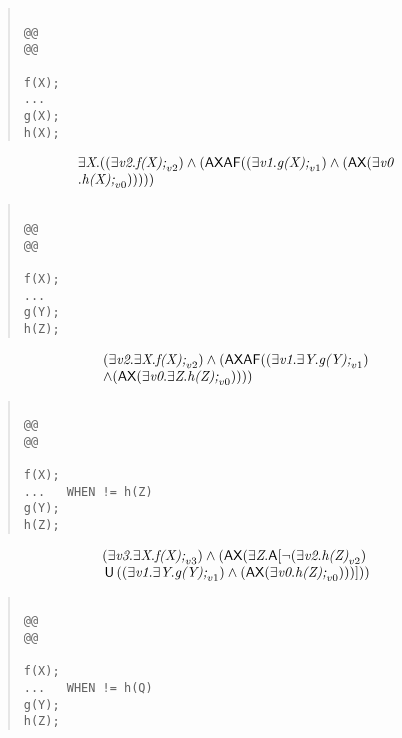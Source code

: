 \documentclass{article}
\newcommand{\U}{\,\mbox{\sf{U}}\,}
\newcommand{\A}{\mbox{\sf{A}}}
\newcommand{\AX}{\mbox{\sf{AX}}}
\newcommand{\AF}{\mbox{\sf{AF}}}
\newcommand{\mita}[1]{\mbox{\it{{#1}}}}
\begin{document}
\begin{quote}\begin{verbatim}

@@
@@

f(X);
...
g(X);
h(X);
\end{verbatim}\end{quote}

\[\begin{array}{l}
\exists \mita{X} . ((\exists \mita{v2} . \mita{f(X);}_{v2}) \wedge (\AX\AF((\exists \mita{v1} . \mita{g(X);}_{v1}) \wedge (\AX(\exists \mita{v0}\\ . \mita{h(X);}_{v0})))))
\end{array}\]

\begin{quote}\begin{verbatim}

@@
@@

f(X);
...
g(Y);
h(Z);
\end{verbatim}\end{quote}

\[\begin{array}{l}
(\exists \mita{v2} . \exists \mita{X} . \mita{f(X);}_{v2}) \wedge (\AX\AF((\exists \mita{v1} . \exists \mita{Y} . \mita{g(Y);}_{v1})\\ \wedge (\AX(\exists \mita{v0} . \exists \mita{Z} . \mita{h(Z);}_{v0}))))
\end{array}\]

\begin{quote}\begin{verbatim}

@@
@@

f(X);
...   WHEN != h(Z)
g(Y);
h(Z);
\end{verbatim}\end{quote}

\[\begin{array}{l}
(\exists \mita{v3} . \exists \mita{X} . \mita{f(X);}_{v3}) \wedge (\AX(\exists \mita{Z} . \A[\neg (\exists \mita{v2} . \mita{h(Z)}_{v2})\\ \U ((\exists \mita{v1} . \exists \mita{Y} . \mita{g(Y);}_{v1}) \wedge (\AX(\exists \mita{v0} . \mita{h(Z);}_{v0})))]
))
\end{array}\]

\begin{quote}\begin{verbatim}

@@
@@

f(X);
...   WHEN != h(Q)
g(Y);
h(Z);
\end{verbatim}\end{quote}
\end{document}
